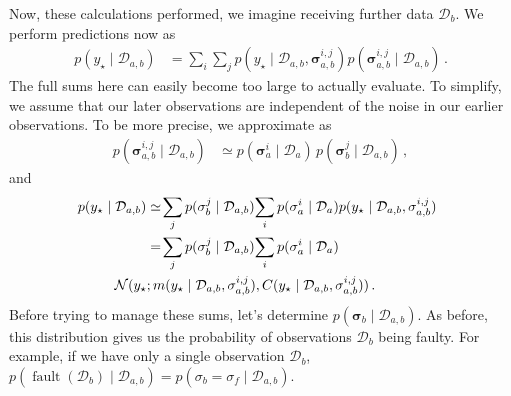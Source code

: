 \documentclass{article}
\newcommand{\given}{\ensuremath{\mid}}
\newcommand{\cm}[1]{\ensuremath{\mathcal{#1}}}
\newcommand{\bm}[1]{\ensuremath{\mathbf{#1}}}
\newcommand{\data}{\ensuremath{\cm{D}}}
\newcommand{\vect}[1]{\bm{#1}}
\newcommand{\vs}{\vect{\sigma}}
\newcommand{\p}[2]{p(#1 \given #2 )}
\newcommand{\fPr}{p}
\newcommand{\Prob}[2]{\fPr(#1 \given #2 )}
\newcommand{\mean}[2]{{m}(#1 \given #2 )}
\newcommand{\cov}[2]{{C}(#1 \given #2 )}
\newcommand{\N}[3]{\cm{N}( #1;#2,#3 )}
\newcommand{\st}{_{\star}}
\DeclareMathOperator{\fault}{fault}
\begin{document}
Now, these calculations performed, we imagine receiving further data
$\data_b$. We perform predictions now as
\begin{align*}
\p{y\st}{\data_{a,b}} & = \sum_{i} \sum_{j} \p{y\st}{\data_{a,b}, \vs^{i,j}_{a,b}} \Prob{\vs^{i,j}_{a,b}}{\data_{a,b}}\,.
\end{align*}
The full sums here can easily become too large to actually
evaluate. To simplify, we assume that our later observations are
independent of the noise in our earlier observations. To be more
precise, we approximate as
\begin{align} \label{eq:approx}
\Prob{\vs^{i,j}_{a,b}}{\data_{a,b}} & \simeq \Prob{\vs^i_{a}}{\data_a}\,\Prob{\vs^j_{b}}{\data_{a,b}}\,,
\end{align}
and
\begin{align}
\hspace{-0.2cm}\p{y\st}{\data_{a,b}} & \simeq \!\sum_{j} \Prob{\vs^j_{b}}{\data_{a,b}}\!\sum_{i} \Prob{\vs^i_{a}}{\data_a} \p{y\st}{\data_{a,b}, \vs^{i,j}_{a,b}}\nonumber\\
& =\!\sum_{j} \Prob{\vs^j_{b}}{\data_{a,b}}\!\sum_{i} \Prob{\vs^i_{a}}{\data_a}\nonumber\\& \hspace{-0.8cm} \N{y\st}{\mean{y\st}{\data_{a,b}, \vs^{i,j}_{a,b}}}{\cov{y\st}{\data_{a,b}, \vs^{i,j}_{a,b}}}\,.\label{eq:sum_o_Gaussians}
\end{align}
Before trying to manage these sums, let's determine
$\Prob{\vs_b}{\data_{a,b}}$. As before, this distribution gives us the
probability of observations $\data_b$ being faulty. For example, if we
have only a single observation $\data_b$, $
\Prob{\fault(\data_b)}{\data_{a,b}} = \Prob{\sigma_b =
  \sigma_f}{\data_{a,b}} $.
\end{document}
